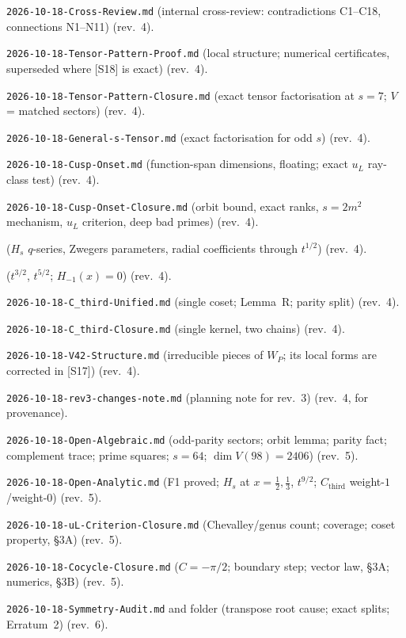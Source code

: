 \documentclass[11pt]{article}
\theoremstyle{definition}
\theoremstyle{plain}
\newcommand{\Cthird}{C_{\mathrm{third}}}
\begin{document}
\begin{enumerate}[label={[S\arabic*]},leftmargin=3em]
\item \texttt{2026-10-18-Cross-Review.md} (internal cross-review: contradictions C1--C18, connections N1--N11) (rev.~4).
\item \texttt{2026-10-18-Tensor-Pattern-Proof.md} (local structure; numerical certificates, superseded where [S18] is exact) (rev.~4).
\item \texttt{2026-10-18-Tensor-Pattern-Closure.md} (exact tensor factorisation at $s=7$; $V$ = matched sectors) (rev.~4).
\item \texttt{2026-10-18-General-s-Tensor.md} (exact factorisation for odd $s$) (rev.~4).
\item \texttt{2026-10-18-Cusp-Onset.md} (function-span dimensions, floating; exact $u_L$ ray-class test) (rev.~4).
\item \texttt{2026-10-18-Cusp-Onset-Closure.md} (orbit bound, exact ranks, $s=2m^2$ mechanism, $u_L$ criterion, deep bad primes) (rev.~4).
\item {} ($H_s$ $q$-series, Zwegers parameters, radial coefficients through $t^{1/2}$) (rev.~4).
\item {} ($t^{3/2}$, $t^{5/2}$; $H_{-1}(x)=0$) (rev.~4).
\item \texttt{2026-10-18-C\_third-Unified.md} (single coset; Lemma~R; parity split) (rev.~4).
\item \texttt{2026-10-18-C\_third-Closure.md} (single kernel, two chains) (rev.~4).
\item \texttt{2026-10-18-V42-Structure.md} (irreducible pieces of $W_P$; its local forms are corrected in [S17]) (rev.~4).
\item \texttt{2026-10-18-rev3-changes-note.md} (planning note for rev.~3) (rev.~4, for provenance).
\item \texttt{2026-10-18-Open-Algebraic.md} (odd-parity sectors; orbit lemma; parity fact; complement trace; prime squares; $s=64$; $\dim V(98)=2406$) (rev.~5).
\item \texttt{2026-10-18-Open-Analytic.md} (F1 proved; $H_s$ at $x=\tfrac12,\tfrac13$, $t^{9/2}$; $\Cthird$ weight-$1$/weight-$0$) (rev.~5).
\item \texttt{2026-10-18-uL-Criterion-Closure.md} (Chevalley/genus count; coverage; coset property, \S3A) (rev.~5).
\item \texttt{2026-10-18-Cocycle-Closure.md} ($C=-\pi/2$; boundary step; vector law, \S3A; numerics, \S3B) (rev.~5).
\item \texttt{2026-10-18-Symmetry-Audit.md} and folder (transpose root cause; exact splits; Erratum~2) (rev.~6).

\end{enumerate}
\end{document}
